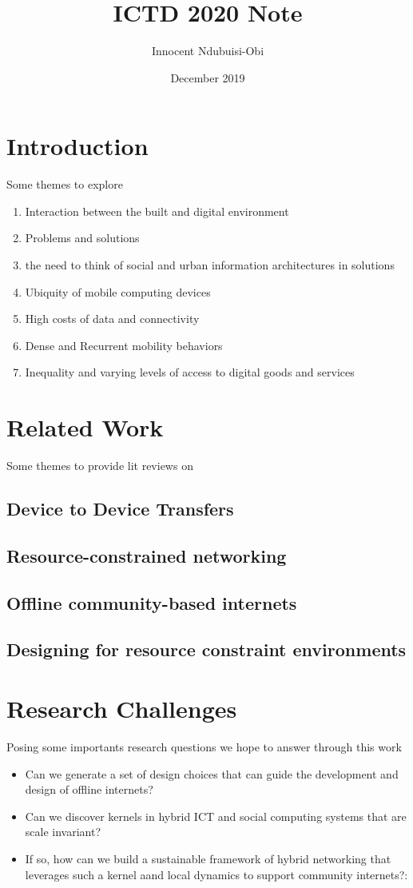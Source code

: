 \documentclass{article}
\title{ICTD 2020 Note}
\author{Innocent Ndubuisi-Obi}
\date{December 2019}
\begin{document}
\maketitle

\section{Introduction}
Some themes to explore
\begin{enumerate}
	\item Interaction between the built and digital environment
		\item Problems and solutions
		\item the need to think of social and urban information architectures in solutions
	\item Ubiquity of mobile computing devices
	\item High costs of data and connectivity
	\item Dense and Recurrent mobility behaviors
	\item Inequality and varying levels of access to digital goods and services
\end{enumerate}

\section{Related Work}
Some themes to provide lit reviews on
\subsection{Device to Device Transfers}
\subsection{Resource-constrained networking}
\subsection{Offline community-based internets}
\subsection{Designing for resource constraint environments}
\section{Research Challenges}
Posing some importants research questions we hope to answer through this work
\begin{itemize}
  \item Can we generate a set of design choices that can guide the development and design of offline internets?
  \item Can we discover kernels in hybrid ICT and social computing systems that are scale invariant?
  \item If so, how can we build a sustainable framework of hybrid networking that leverages such a kernel aand local dynamics to support community internets?:
\end{itemize}
\end{document}

